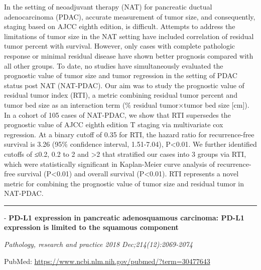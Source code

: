 \documentclass[]{article}
\begin{document}
In the setting of neoadjuvant therapy (NAT) for pancreatic ductual
adenocarcinoma (PDAC), accurate measurement of tumor size, and
consequently, staging based on AJCC eighth edition, is difficult.
Attempts to address the limitations of tumor size in the NAT setting
have included correlation of residual tumor percent with survival.
However, only cases with complete pathologic response or minimal
residual disease have shown better prognosis compared with all other
groups. To date, no studies have simultaneously evaluated the prognostic
value of tumor size and tumor regression in the setting of PDAC status
post NAT (NAT-PDAC). Our aim was to study the prognostic value of
residual tumor index (RTI), a metric combining residual tumor percent
and tumor bed size as an interaction term (\% residual tumor×tumor bed
size {[}cm{]}). In a cohort of 105 cases of NAT-PDAC, we show that RTI
supersedes the prognostic value of AJCC eighth edition T staging via
multivariate cox regression. At a binary cutoff of 0.35 for RTI, the
hazard ratio for recurrence-free survival is 3.26 (95\% confidence
interval, 1.51-7.04), P\textless{}0.01. We further identified cutoffs of
≤0.2, 0.2 to 2 and \textgreater{}2 that stratified our cases into 3
groups via RTI, which were statistically significant in Kaplan-Meier
curve analysis of recurrence-free survival (P\textless{}0.01) and
overall survival (P\textless{}0.01). RTI represents a novel metric for
combining the prognostic value of tumor size and residual tumor in
NAT-PDAC.

{}

{}

\begin{center}\rule{0.5\linewidth}{\linethickness}\end{center}

 - \textbf{PD-L1 expression in pancreatic adenosquamous carcinoma: PD-L1
expression is limited to the squamous component}

\emph{Pathology, research and practice 2018 Dec;214(12):2069-2074}

PubMed: \url{https://www.ncbi.nlm.nih.gov/pubmed/?term=30477643}
\end{document}
